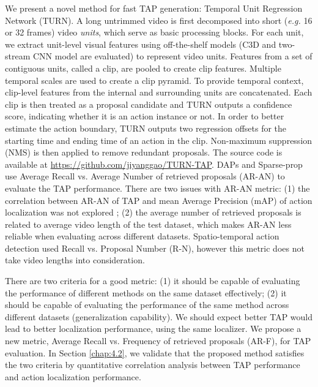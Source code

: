 \documentclass[10pt,twocolumn,letterpaper]{article}
\begin{document}
We present a novel method for fast TAP generation: Temporal Unit Regression Network (TURN). A long untrimmed video is first decomposed into short (\emph{e.g.} 16 or 32 frames) video \emph{units}, which serve as basic processing blocks. For each unit, we extract unit-level visual features using off-the-shelf models (C3D and two-stream CNN model are evaluated) to represent video units. Features from a set of contiguous units, called a clip, are pooled to create clip features. Multiple temporal scales are used to create a clip pyramid. To provide temporal context, clip-level features from the internal and surrounding units are concatenated. Each clip is then treated as a proposal candidate and TURN outputs a confidence score,  indicating whether it is an action instance or not. In order to better estimate the action boundary, TURN outputs two regression offsets for the starting time and ending time of an action in the clip. Non-maximum suppression (NMS) is then applied to remove redundant proposals. The source code is available at \url{https://github.com/jiyanggao/TURN-TAP}.
\label{sec: metric correlation}
DAPs \cite{escorcia2016daps} and Sparse-prop \cite{Heilbron_2016_CVPR} use Average Recall vs. Average Number of retrieved proposals (AR-AN) to evaluate the TAP performance. There are two issues with AR-AN metric: (1) the correlation between AR-AN of TAP and mean Average Precision (mAP) of action localization was not explored
; (2) the average number of retrieved proposals is related to average video length of the test dataset, which makes AR-AN less reliable when evaluating across different datasets. Spatio-temporal action detection \cite{yu2015fast, Wang_2016_CVPR} used Recall vs. Proposal Number (R-N), however this metric does not take video lengths into consideration. 

There are two criteria for a good metric: (1) it should be capable of evaluating the performance of different methods on the same dataset effectively; (2) it should be capable of evaluating the performance of the same method across different datasets (generalization capability). We should expect better TAP would lead to better localization performance, using the same localizer. We propose a new metric, Average Recall vs. Frequency of retrieved proposals (AR-F), for TAP evaluation. In Section \ref{chap:4.2}, we validate that the proposed method satisfies the two criteria by quantitative correlation analysis between TAP performance and action localization performance.
\end{document}

